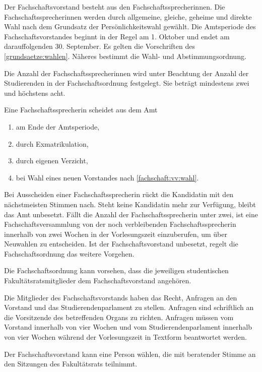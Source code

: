 Der Fachschaftsvorstand besteht aus den Fach\-schafts\-sprech\-erinnen. Die Fach\-schafts\-sprech\-erinnen werden durch allgemeine, gleiche, geheime und direkte Wahl nach dem Grundsatz der Persönlichkeitswahl gewählt. Die Amtsperiode des Fachschaftsvorstandes beginnt in der Regel am 1. Oktober und endet am darauffolgenden 30. September. Es gelten die Vorschriften des \ref{grundsaetze:wahlen}. Näheres bestimmt die Wahl- und Abstimmungsordnung.

Die Anzahl der Fachschaftssprecherinnen wird unter Beachtung der Anzahl der Studierenden in der Fachschaftsordnung festgelegt. Sie beträgt mindestens zwei und höchstens acht. \label{fs:vorstand:anzahl}

%
%

Eine Fachschaftssprecherin scheidet aus dem Amt
  \begin{enumerate}
  \item am Ende der Amtsperiode,
  \item durch Exmatrikulation,
  \item durch eigenen Verzicht,
  \item bei Wahl eines neuen Vorstandes nach \ref{fachschaft:vv:wahl}.
\end{enumerate}

Bei Ausscheiden einer Fach\-schafts\-sprecherin rückt die Kandidatin mit den nächstmeisten Stimmen nach. Steht keine Kandidatin mehr zur Verfügung, bleibt das Amt unbesetzt. Fällt die Anzahl der Fach\-schafts\-sprecherin unter zwei, ist eine Fach\-schafts\-versammlung von der noch verbleibenden Fach\-schafts\-sprecherin innerhalb von zwei Wochen in der Vorlesungszeit einzuberufen, um über Neuwahlen zu entscheiden. Ist der Fach\-schafts\-vorstand unbesetzt, regelt die Fach\-schafts\-ordnung das weitere Vorgehen.

Die Fach\-schafts\-ordnung kann vorsehen, dass die jeweiligen studentischen Fakultätsratsmitglieder dem Fachschaftsvorstand angehören.

Die Mitglieder des Fachschaftsvorstands haben das Recht, Anfragen an den  Vorstand und das Studierendenparlament zu stellen. Anfragen sind  schriftlich an die Vorsitzende des betreffenden Organs zu richten.  Anfragen müssen vom Vorstand innerhalb von vier Wochen und vom Studierendenparlament innerhalb von vier Wochen während der Vorlesungszeit in Textform beantwortet werden.

Der Fachschaftsvorstand kann eine Person wählen, die mit beratender Stimme an den Sitzungen des Fakultätsrats teilnimmt.


